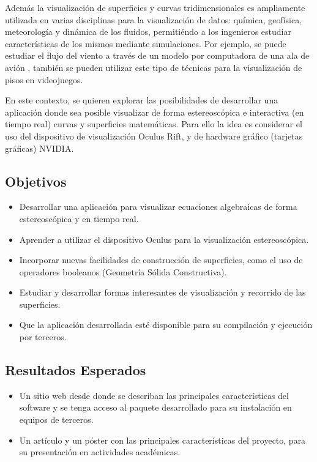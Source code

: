 \documentclass[12pt]{article}
\begin{document}
Además la visualización de superficies y curvas tridimensionales es ampliamente utilizada en varias disciplinas para la visualización de datos: química, geofísica, meteorología y dinámica de los fluidos, permitiéndo a los ingenieros estudiar características de los mismos mediante simulaciones. Por ejemplo, se puede estudiar el flujo del viento a través de un modelo por computadora de una ala de avión \cite{aircraftwing}, también se pueden utilizar este tipo de técnicas para la visualización de pisos en videojuegos\cite{realtimerendering}\cite{engine}.

En este contexto, se quieren explorar las posibilidades de desarrollar una aplicación donde sea posible visualizar de forma estereoscópica e interactiva (en tiempo real) curvas y superficies matemáticas. Para ello la idea es considerar el uso del dispositivo de visualización Oculus Rift, y de hardware gráfico (tarjetas gráficas) NVIDIA.
\subsection{Objetivos}
\begin{itemize}
\item Desarrollar una aplicación para visualizar ecuaciones algebraicas de forma estereoscópica y en tiempo real.
\item Aprender a utilizar el dispositivo Oculus para la visualización estereoscópica. 
\item Incorporar nuevas facilidades de construcción de superficies, como el uso de operadores booleanos (Geometría Sólida Constructiva). 
\item Estudiar y desarrollar formas interesantes de visualización y recorrido de las superficies.
\item Que la aplicación desarrollada esté disponible para su compilación y ejecución por terceros. 
\end{itemize}
\subsection{Resultados Esperados}
\begin{itemize}
\item Un sitio web desde donde se describan las principales características del software y se tenga acceso al paquete desarrollado para su instalación en equipos de terceros. 
\item Un artículo y un póster con las principales características del proyecto, para su presentación en actividades académicas.
\end{itemize}
\clearpage
\end{document}
